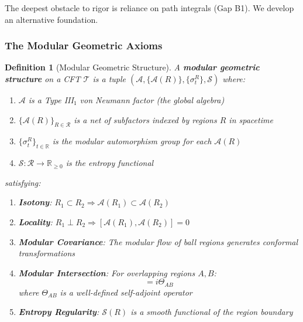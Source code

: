\documentclass[12pt,a4paper]{article}
\newtheorem{definition}[theorem]{Definition}
\begin{document}
The deepest obstacle to rigor is reliance on path integrals (Gap B1). We develop an alternative foundation.

\subsubsection{The Modular Geometric Axioms}

\begin{definition}[Modular Geometric Structure]\label{def:modular-geom}
A \textbf{modular geometric structure} on a CFT $\mathcal{T}$ is a tuple $(\mathcal{A}, \{\mathcal{A}(R)\}, \{\sigma^R_t\}, \mathcal{S})$ where:
\begin{enumerate}
    \item $\mathcal{A}$ is a Type III$_1$ von Neumann factor (the global algebra)
    \item $\{\mathcal{A}(R)\}_{R \in \mathcal{R}}$ is a net of subfactors indexed by regions $R$ in spacetime
    \item $\{\sigma^R_t\}_{t \in \mathbb{R}}$ is the modular automorphism group for each $\mathcal{A}(R)$
    \item $\mathcal{S}: \mathcal{R} \to \mathbb{R}_{\geq 0}$ is the entropy functional
\end{enumerate}
satisfying:
\begin{enumerate}[label=\textbf{(MG\arabic*)}]
    \item \textbf{Isotony}: $R_1 \subset R_2 \Rightarrow \mathcal{A}(R_1) \subset \mathcal{A}(R_2)$
    \item \textbf{Locality}: $R_1 \perp R_2 \Rightarrow [\mathcal{A}(R_1), \mathcal{A}(R_2)] = 0$
    \item \textbf{Modular Covariance}: The modular flow of ball regions generates conformal transformations
    \item \textbf{Modular Intersection}: For overlapping regions $A, B$:
    \begin{equation}
    [\log \Delta_A, \log \Delta_B] = i\Theta_{AB}
    \end{equation}
    where $\Theta_{AB}$ is a well-defined self-adjoint operator
    \item \textbf{Entropy Regularity}: $\mathcal{S}(R)$ is a smooth functional of the region boundary
\end{enumerate}
\end{definition}
\end{document}
